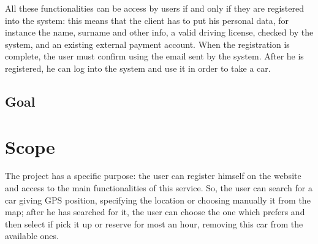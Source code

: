 \documentclass[11pt,a4paper]{report}
\begin{document}
All these functionalities can be access by users if and only if they are registered into the system:
this means that the client has to put his personal data, for instance the name, surname and other info, a valid driving license, checked by the system, and an existing external payment account.
When the registration is complete, the user must confirm using the email sent by the system.
After he is registered, he can log into the system and use it in order to take a car.

\subsection{Goal}

\section{Scope}
The project has a specific purpose: the user can register himself on the website and access to the main functionalities of this service.
So, the user can search for a car giving GPS position, specifying the location or choosing manually it from the map; after he has searched for it, the user can choose the one which prefers and then select if pick it up or reserve for most an hour, removing this car from the available ones.
\end{document}
